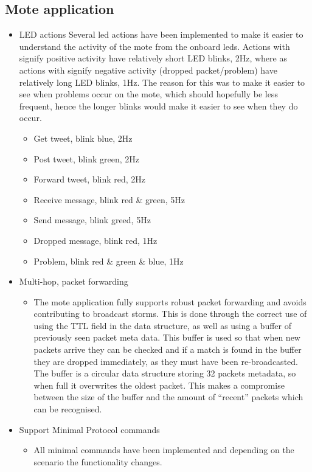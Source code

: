 \documentclass{article}
\begin{document}
\subsection{Mote application}
\begin{itemize}
	\item LED actions
	Several led actions have been implemented to make it easier to understand the activity of the mote from the onboard leds. Actions with signify positive activity have relatively short LED blinks, 2Hz, where as actions with signify negative activity (dropped packet/problem) have relatively long LED blinks, 1Hz. The reason for this was to make it easier to see when problems occur on the mote, which should hopefully be less frequent, hence the longer blinks would make it easier to see when they do occur.
	\begin{itemize}
		\item Get tweet, blink blue, 2Hz
		\item Post tweet, blink green, 2Hz
		\item Forward tweet, blink red, 2Hz 
		\item Receive message, blink red \& green, 5Hz
		\item Send message, blink greed, 5Hz
		\item Dropped message, blink red, 1Hz
		\item Problem, blink red \& green \& blue, 1Hz
	\end{itemize}
	\item Multi-hop, packet forwarding
	\begin{itemize}
		\item The mote application fully supports robust packet forwarding and avoids contributing to broadcast storms. This is done through the correct use of using the TTL field in the data structure, as well as using a buffer of previously seen packet meta data. This buffer is used so that when new packets arrive they can be checked and if a match is found in the buffer they are dropped immediately, as they must have been re-broadcasted. The buffer is a circular data structure storing 32 packets metadata, so when full it overwrites the oldest packet. This makes a compromise between the size of the buffer and the amount of ``recent'' packets which can be recognised.
	\end{itemize}
	\item Support Minimal Protocol commands
	\begin{itemize}
		\item All minimal commands have been implemented and depending on the scenario the functionality changes.

\end{itemize}
\end{itemize}
\end{document}
